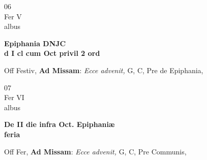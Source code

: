 \documentclass[10pt, openany]{book}
\begin{document}
        \begin{center}
            \begin{minipage}{3.5in}
                \vspace{2em}
                \begin{minipage}{0.5in}
                    {\Huge 06} \\
                    {\normalsize Fer V} \\
                    {\normalsize albus}
                \end{minipage}
                \begin{minipage}{3.0in}
                    \textbf{ \large Epiphania DNJC \\
                    \textnormal{\normalsize d I cl cum Oct privil 2 ord}} \\ 
                \end{minipage}
                \begin{justify}Off Festiv, \textbf{Ad Missam}: \textit{Ecce advenit,} G, C, Pre de Epiphania,   
                \end{justify}
            \end{minipage}
        \end{center}
    
        \begin{center}
            \begin{minipage}{3.5in}
                \vspace{2em}
                \begin{minipage}{0.5in}
                    {\Huge 07} \\
                    {\normalsize Fer VI} \\
                    {\normalsize albus}
                \end{minipage}
                \begin{minipage}{3.0in}
                    \textbf{ \large De II die infra Oct. Epiphaniæ \\
                    \textnormal{\normalsize feria}} \\ 
                \end{minipage}
                \begin{justify}Off Fer, \textbf{Ad Missam}: \textit{Ecce advenit,} G, C, Pre Communis,   
                \end{justify}
            \end{minipage}
        \end{center}
    
\end{document}

